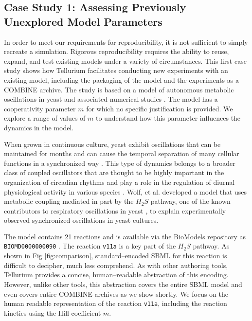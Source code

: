 \documentclass[10pt,letterpaper]{article}
\begin{document}
\subsection*{Case Study 1: Assessing Previously Unexplored Model Parameters}

In order to meet our requirements for reproducibility, it is not sufficient to simply recreate a simulation. Rigorous reproducibility requires the ability to reuse, expand, and test existing models under a variety of circumstances. This first case study shows how Tellurium facilitates conducting new experiments with an existing model, including the packaging of the model and the experiments as a COMBINE archive. The study is based on a model of autonomous metabolic oscillations in yeast and associated numerical studies \cite{wolf2001mathematical}. The model has a cooperativity parameter $m$ for which no specific justification is provided. We explore a range of values of $m$ to understand how this parameter influences the dynamics in the model.

When grown in continuous culture, yeast exhibit oscillations that can be maintained for months and can cause the temporal separation of many cellular functions in a synchronized way \cite{murray2007regulation}. This type of dynamics belongs to a broader class of coupled oscillators that are thought to be highly important in the organization of circadian rhythms and play a role in the regulation of diurnal physiological activity in various species \cite{winfree1967biological,dodd2005plant}.
Wolf, et al. \cite{wolf2001mathematical} developed a model that uses metabolic coupling mediated in part by the $H_2 S$ pathway, one of the known contributors to respiratory oscillations in yeast \cite{murray2007regulation}, to explain experimentally observed synchronized oscillations in yeast cultures.

The model contains 21 reactions and is available via the BioModels repository as \texttt{BIOMD0000000090} \cite{wolfbiomod}. The reaction \texttt{v11a} is a key part of the $H_2S$ pathway. As shown in Fig  \ref{fig:comparison}, standard--encoded SBML for this reaction is difficult to decipher, much less comprehend. As with other authoring tools, Tellurium provides a concise, human--readable abstraction of this encoding. However, unlike other tools, this abstraction covers the entire SBML model and even covers entire COMBINE archives as we show shortly. We focus on the human readable representation of the reaction \texttt{v11a}, including the reaction kinetics using the Hill coefficient $m$.
\end{document}
